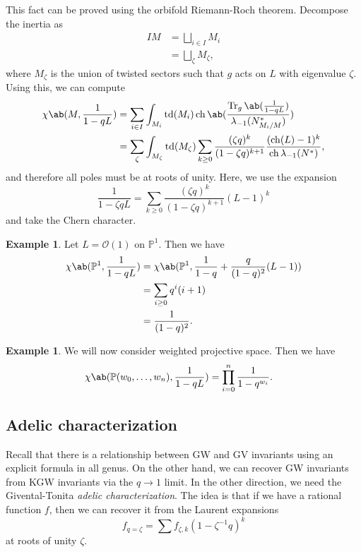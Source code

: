 \documentclass{amsart}
\theoremstyle{definition}
\newtheorem{exm}[thm]{Example}
\theoremstyle{remark}
\theoremstyle{plain}
\theoremstyle{definition}
\theoremstyle{remark}
\renewcommand{\P}{\mathbb{P}}
\newcommand{\mc}[1]{\mathcal{#1}}
\newcommand{\on}[1]{\operatorname{#1}}
\newcommand{\1}{\mathbf{1}}
\newcommand{\2}{\mathbf{2}}
\newcommand{\3}{\mathbf{3}}
\DeclareMathOperator{\ch}{ch}
\begin{document}
This fact can be proved using the orbifold Riemann-Roch theorem. Decompose the inertia as
\begin{align*}
    IM &= \bigsqcup_{i \in I} M_i \\
    &= \bigsqcup_{\zeta} M_{\zeta},
\end{align*}
where \(M_{\zeta}\) is the union of twisted sectors such that \(g\) acts on \(L\) with eigenvalue \(\zeta\). Using this, we can compute
\begin{align*}
    \chi\ab(M, \frac{1}{1-qL}) &= \sum_{i \in I} \int_{M_i} \on{td}(M_i) \on{ch} \ab(\frac{ \on{Tr}_g \ab(\frac{1}{1-qL}) }{\lambda_{-1}(N_{M_i/M}^*)}) \\
    &= \sum_{\zeta} \int_{M_{\zeta}} \on{td}(M_{\zeta}) \sum_{k \geq 0} \frac{(\zeta q)^k}{(1-\zeta q)^{k+1}} \frac{( \on{ch}(L)-1 )^k}{\ch \lambda_{-1}(N^*)},
\end{align*}
and therefore all poles must be at roots of unity. Here, we use the expansion
\[ \frac{1}{1-\zeta q L} = \sum_{k \geq 0} \frac{(\zeta q)^k}{(1-\zeta q)^{k+1}} (L-1)^k \]
and take the Chern character.

\begin{exm}
    Let \(L = \mc{O}(1)\) on \(\P^1\). Then we have
    \begin{align*}
        \chi\ab(\P^1, \frac{1}{1-qL}) &= \chi\ab(\P^1, \frac{1}{1-q} + \frac{q}{(1-q)^2}(L-1)) \\
        &= \sum_{i \geq 0} q^i (i+1) \\
        &= \frac{1}{(1-q)^2}.
    \end{align*}
\end{exm}

\begin{exm}
    We will now consider weighted projective space. Then we have
    \begin{align*}
        \chi\ab(\P(w_0, \ldots, w_n), \frac{1}{1-qL}) &= \prod_{i=0}^n \frac{1}{1-q^{w_i}}. 
    \end{align*}
\end{exm}

\subsection{Adelic characterization}%
\label{sub:Adelic characterization}

Recall that there is a relationship between GW and GV invariants using an explicit formula in all genus. On the other hand, we can recover GW invariants from KGW invariants via the \(q \to 1\) limit. In the other direction, we need the Givental-Tonita \textit{adelic characterization}. The idea is that if we have a rational function \(f\), then we can recover it from the Laurent expansions
\[ f_{q=\zeta} = \sum f_{\zeta, k} (1-\zeta^{-1} q)^k \]
at roots of unity \(\zeta\).
\end{document}
